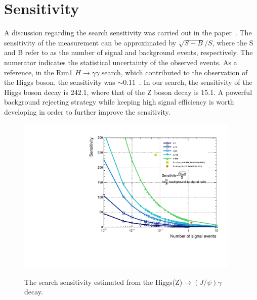 \chapter{Sensitivity}
\label{sec:Appendix_sens} 
A discussion regarding the search sensitivity was carried out in the paper~\cite{HiggsBosonDecaysToQuarkonia}. The sensitivity of the measurement can be approximated by $\sqrt{S+B}/S$, where the S and B refer to as the number of signal and background events, respectively. The numerator indicates the statistical uncertainty of the observed events. As a reference, in the Run1 $H\to\gamma\gamma$ search, which contributed to the observation of the Higgs boson, the sensitivity was $\sim 0.11$~\cite{Khachatryan:2014ira}. In our search, the sensitivity of the Higgs boson decay is 242.1, where that of the Z boson decay is 15.1. A powerful background rejecting strategy while keeping high signal efficiency is worth developing in order to further improve the sensitivity. 

\begin{figure}[!ht]
  \begin{center}
    \includegraphics[width=0.95\textwidth]{Fig/Sensitivity_scan}\\
    \caption{The search sensitivity estimated from the Higgs(Z)$\to (J/\psi)\gamma$ decay.}
    \label{fig:Sensitivity}
  \end{center}
\end{figure}